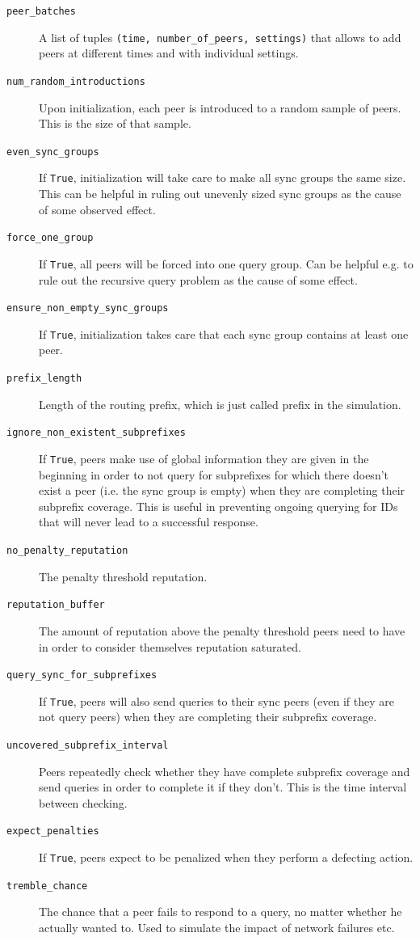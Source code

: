 \begin{description}
\item[\texttt{peer\_batches}] A list of tuples \texttt{(time, number\_of\_peers,
settings)} that allows to add peers at different times and with individual
settings.
\item[\texttt{num\_random\_introductions}] Upon initialization, each peer is
introduced to a random sample of peers. This is the size of that sample.
\item[\texttt{even\_sync\_groups}] If \texttt{True}, initialization will take
care to make all sync groups the same size. This can be helpful in ruling out
unevenly sized sync groups as the cause of some observed effect.
\item[\texttt{force\_one\_group}] If \texttt{True}, all peers will be forced
into one query group. Can be helpful e.g. to rule out the recursive query
problem as the cause of some effect.
\item[\texttt{ensure\_non\_empty\_sync\_groups}] If \texttt{True},
initialization takes care that each sync group contains at least one peer.
\item[\texttt{prefix\_length}] Length of the routing prefix, which is just
called prefix in the simulation.
\item[\texttt{ignore\_non\_existent\_subprefixes}] If \texttt{True}, peers make
use of global information they are given in the beginning in order to not query
for subprefixes for which there doesn't exist a peer (i.e. the sync group is
empty) when they are completing their subprefix coverage. This is useful in
preventing ongoing querying for IDs that will never lead to a successful
response.
\item[\texttt{no\_penalty\_reputation}] The penalty threshold reputation.
\item[\texttt{reputation\_buffer}] The amount of reputation above the penalty
threshold peers need to have in order to consider themselves reputation
saturated.
\item[\texttt{query\_sync\_for\_subprefixes}] If \texttt{True}, peers will also
send queries to their sync peers (even if they are not query peers) when they
are completing their subprefix coverage.
\item[\texttt{uncovered\_subprefix\_interval}] Peers repeatedly check whether
they have complete subprefix coverage and send queries in order to complete it
if they don't. This is the time interval between checking.
\item[\texttt{expect\_penalties}] If \texttt{True}, peers expect to be penalized
when they perform a defecting action.
\item[\texttt{tremble\_chance}] The chance that a peer fails to respond to a
query, no matter whether he actually wanted to. Used to simulate the impact of
network failures etc.
\end{description}



